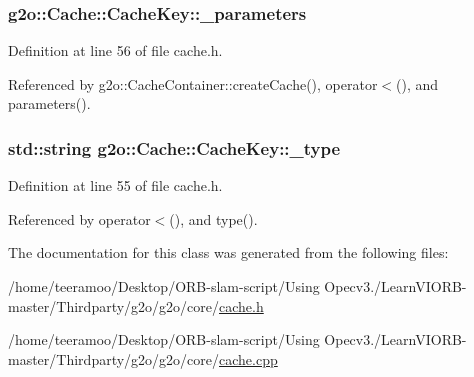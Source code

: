 \subsubsection[{\texorpdfstring{\+\_\+parameters}{_parameters}}]{ g2o\+::\+Cache\+::\+Cache\+Key\+::\+\_\+parameters\hspace{0.3cm}{\ttfamily [protected]}}\hypertarget{classg2o_1_1Cache_1_1CacheKey_a3f8dc2307bd1d174a30bdc8443a8d152}{}\label{classg2o_1_1Cache_1_1CacheKey_a3f8dc2307bd1d174a30bdc8443a8d152}


Definition at line 56 of file cache.\+h.



Referenced by g2o\+::\+Cache\+Container\+::create\+Cache(), operator$<$(), and parameters().

\subsubsection[{\texorpdfstring{\+\_\+type}{_type}}]{\setlength{\rightskip}{0pt plus 5cm}std\+::string g2o\+::\+Cache\+::\+Cache\+Key\+::\+\_\+type\hspace{0.3cm}{\ttfamily [protected]}}\hypertarget{classg2o_1_1Cache_1_1CacheKey_a886ec6cf583561cb791cbaff902c673d}{}\label{classg2o_1_1Cache_1_1CacheKey_a886ec6cf583561cb791cbaff902c673d}


Definition at line 55 of file cache.\+h.



Referenced by operator$<$(), and type().



The documentation for this class was generated from the following files\+:\begin{DoxyCompactItemize}
\item 
/home/teeramoo/\+Desktop/\+O\+R\+B-\/slam-\/script/\+Using Opecv3./\+Learn\+V\+I\+O\+R\+B-\/master/\+Thirdparty/g2o/g2o/core/\hyperlink{cache_8h}{cache.\+h}\item 
/home/teeramoo/\+Desktop/\+O\+R\+B-\/slam-\/script/\+Using Opecv3./\+Learn\+V\+I\+O\+R\+B-\/master/\+Thirdparty/g2o/g2o/core/\hyperlink{cache_8cpp}{cache.\+cpp}\end{DoxyCompactItemize}
